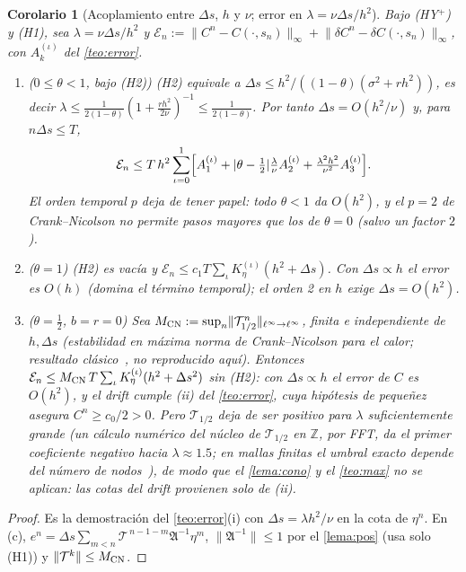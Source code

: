 \documentclass[11pt,letterpaper]{article}
\theoremstyle{plain}
\newtheorem{corolario}[theorem]{Corolario}
\theoremstyle{definition}
\theoremstyle{remark}
\numberwithin{equation}{section}
\newcommand{\Z}{\mathbb{Z}}
\newcommand{\norm}[1]{\lVert #1\rVert}
\newcommand{\Top}{\mathcal{T}}
\begin{document}
	\begin{corolario}[Acoplamiento entre \(\Delta s\), \(h\) y \(\nu\); error en \(\lambda=\nu\Delta s/h^2\)]\label{cor:acopla}
		Bajo (HY\(^+\)) y (H1), sea \(\lambda=\nu\Delta s/h^2\) y \(\mathcal E_n:=\norm{C^n-C(\cdot,s_n)}_\infty+\norm{\delta C^n-\delta C(\cdot,s_n)}_\infty\), con \(A^{(\iota)}_k\) del \cref{teo:error}.
		\begin{enumerate}[label=(\alph*)]
			\item (\(0\le\theta<1\), bajo (H2)) (H2) equivale a \(\Delta s\le h^2/((1-\theta)(\sigma^2+rh^2))\), es decir \(\lambda\le\frac1{2(1-\theta)}(1+\frac{rh^2}{2\nu})^{-1}\le\frac1{2(1-\theta)}\). Por tanto \(\Delta s=O(h^2/\nu)\) y, para \(n\Delta s\le T\),
			\[
			\mathcal E_n\le T\,h^2\sum_{\iota=0}^1\Bigl[A_1^{(\iota)}+|\theta-\tfrac12|\tfrac\lambda\nu A_2^{(\iota)}+\tfrac{\lambda^2h^2}{\nu^2}A_3^{(\iota)}\Bigr].
			\]
			El orden temporal \(p\) deja de tener papel: todo \(\theta<1\) da \(O(h^2)\), y el \(p=2\) de Crank--Nicolson no permite pasos mayores que los de \(\theta=0\) (salvo un factor \(2\)).
			\item (\(\theta=1\)) (H2) es vacía y \(\mathcal E_n\le c_1T\sum_\iota K_\eta^{(\iota)}(h^2+\Delta s)\). Con \(\Delta s\propto h\) el error es \(O(h)\) (domina el término temporal); el orden 2 en \(h\) exige \(\Delta s=O(h^2)\).
			\item (\(\theta=\frac12\), \(b=r=0\)) Sea \(M_{\rm CN}:=\sup_n\norm{\Top_{1/2}^n}_{\ell^\infty\to\ell^\infty}\), finita e independiente de \(h,\Delta s\) (estabilidad en máxima norma de Crank--Nicolson para el calor; resultado clásico~\cite{Widlund1966,Serdyukova1966}, no reproducido aquí). Entonces \(\mathcal E_n\le M_{\rm CN}\,T\sum_\iota K_\eta^{(\iota)}(h^2+\Delta s^2)\) sin (H2): con \(\Delta s\propto h\) el error de \(C\) es \(O(h^2)\), y el drift cumple (ii) del \cref{teo:error}, cuya hipótesis de pequeñez asegura \(C^n\ge c_0/2>0\). Pero \(\Top_{1/2}\) deja de ser positivo para \(\lambda\) suficientemente grande (un cálculo numérico del núcleo de \(\Top_{1/2}\) en \(\Z\), por FFT, da el primer coeficiente negativo hacia \(\lambda\approx1.5\); en mallas finitas el umbral exacto depende del número de nodos~\cite{HigueresRoldan2023}), de modo que el \cref{lema:cono} y el \cref{teo:max} no se aplican: las cotas del drift provienen solo de (ii).
		\end{enumerate}
	\end{corolario}
	
	\begin{proof}
		Es la demostración del \cref{teo:error}(i) con \(\Delta s=\lambda h^2/\nu\) en la cota de \(\eta^n\). En (c), \(e^n=\Delta s\sum_{m<n}\Top^{\,n-1-m}\mathfrak A^{-1}\eta^m\), \(\norm{\mathfrak A^{-1}}\le1\) por el \cref{lema:pos} (usa solo (H1)) y \(\norm{\Top^k}\le M_{\rm CN}\).
	\end{proof}
	
\end{document}
